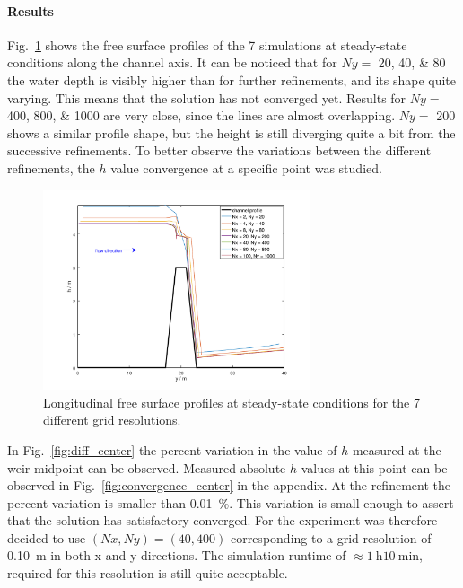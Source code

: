 \paragraph{Results} Fig.~\ref{fig:water_profiles} shows the free surface profiles of the \num{7} simulations at steady-state conditions along the channel axis.
It can be noticed that for $Ny =$ \numlist{20;40;80} the water depth is visibly higher than for further refinements, and its shape quite varying.
This means that the solution has not converged yet.
Results for $Ny =$ \numlist{400;800;1000} are very close, since the lines are almost overlapping.
$Ny =$ \num{200} shows a similar profile shape, but the height is still diverging quite a bit from the successive refinements.
To better observe the variations between the different refinements, the $h$ value convergence at a specific point was studied.

\begin{figure}[h]
  \centering
  \includegraphics[width=0.7\textwidth]{Figures/water_profiles.png}
  \caption{Longitudinal free surface profiles at steady-state conditions for the \num{7} different grid resolutions.}
  \label{fig:water_profiles}
\end{figure}

In Fig.~\ref{fig:diff_center} the percent variation in the value of $h$ measured at the weir midpoint can be observed.
Measured absolute $h$ values at this point can be observed in Fig.~\ref{fig:convergence_center} in the appendix. 
At the  refinement the percent variation is smaller than \SI{0.01}{\percent}.
This variation is small enough to assert that the solution has satisfactory converged.
For the experiment was therefore decided to use $(Nx, Ny) = (\num{40}, \num{400})$ corresponding to a grid resolution of \SI{0.10}{\m} in both x and y directions. The simulation runtime of $\approx \SI{1}{\hour} \SI{10}{\minute}$, required for this resolution is still quite acceptable.


